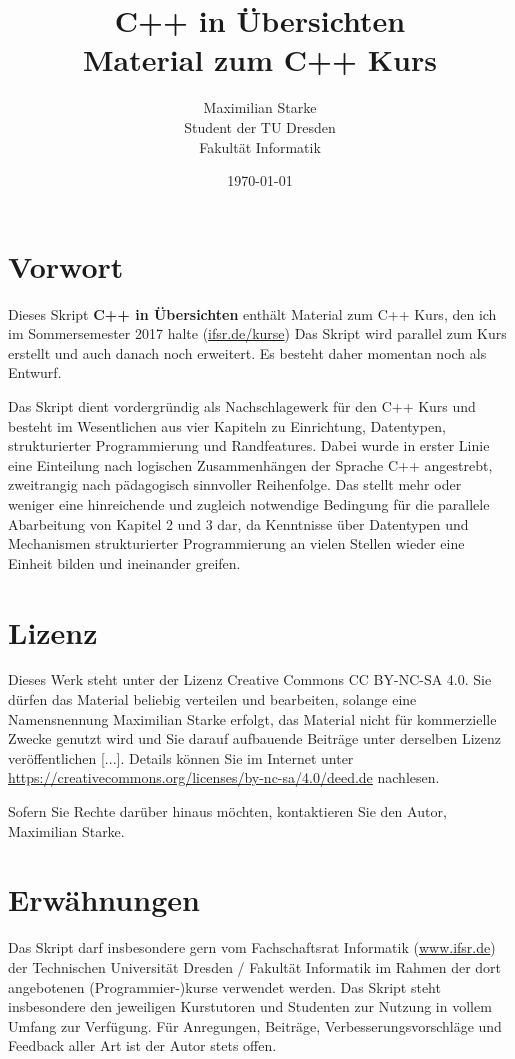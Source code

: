 \documentclass[a4paper]{report}
\title{\Huge \textbf{C++ in Übersichten} \\ \medskip \Large Material zum C++ Kurs}
\author{Maximilian Starke \\ Student der TU Dresden \\ Fakultät Informatik}
\date{\today}
\begin{document}
\maketitle

\section*{Vorwort}
Dieses Skript \textbf{C++ in Übersichten} enthält Material zum C++ Kurs, den ich im Sommersemester 2017 halte (\url{ifsr.de/kurse})
Das Skript wird parallel zum Kurs erstellt und auch danach noch erweitert. Es besteht daher momentan noch als Entwurf.

Das Skript dient vordergründig als Nachschlagewerk für den C++ Kurs und besteht im Wesentlichen aus vier Kapiteln zu Einrichtung, Datentypen, strukturierter Programmierung und Randfeatures. Dabei wurde in erster Linie eine Einteilung nach logischen Zusammenhängen der Sprache C++ angestrebt, zweitrangig nach pädagogisch sinnvoller Reihenfolge. Das stellt mehr oder weniger eine hinreichende und zugleich notwendige Bedingung für die parallele Abarbeitung von Kapitel 2 und 3 dar, da Kenntnisse über Datentypen und Mechanismen strukturierter Programmierung an vielen Stellen wieder eine Einheit bilden und ineinander greifen.


\section*{Lizenz}
Dieses Werk steht unter der Lizenz Creative Commons CC BY-NC-SA 4.0. Sie dürfen das Material beliebig verteilen und bearbeiten, solange eine Namensnennung \textcopyright \vspace{0.3ex} Maximilian Starke erfolgt, das Material nicht für kommerzielle Zwecke genutzt wird und Sie darauf aufbauende Beiträge unter derselben Lizenz veröffentlichen [...]. Details können Sie im Internet unter \url{https://creativecommons.org/licenses/by-nc-sa/4.0/deed.de} nachlesen.

Sofern Sie Rechte darüber hinaus möchten, kontaktieren Sie den Autor, Maximilian Starke.


\section*{Erwähnungen}
Das Skript darf insbesondere gern vom Fachschaftsrat Informatik (\url{www.ifsr.de}) der Technischen Universität Dresden / Fakultät Informatik im Rahmen der dort angebotenen (Programmier-)kurse verwendet werden. Das Skript steht insbesondere den jeweiligen Kurstutoren und Studenten zur Nutzung in vollem Umfang zur Verfügung. Für Anregungen, Beiträge, Verbesserungsvorschläge und Feedback aller Art ist der Autor stets offen.
\end{document}
